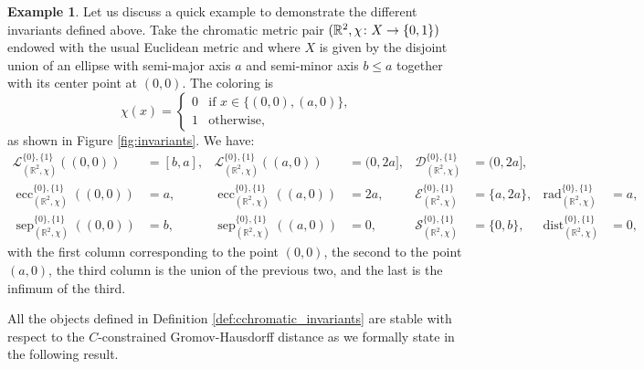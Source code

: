 \documentclass[8pt,a4paper,oneside,english,english]{article}
\theoremstyle{plain}
\theoremstyle
{plain}
\theoremstyle{definition}
\newtheorem{example}[theorem]{Example}%
\DeclareMathOperator{\dist}{dist}
\DeclareMathOperator{\ecc}{ecc}
\DeclareMathOperator{\rad}{rad}
\DeclareMathOperator{\sep}{sep}
\begin{document}
\begin{example} \label{ex:invariants}
    Let us discuss 
    a quick example to demonstrate the different invariants defined above. Take the chromatic metric pair $(\mathbb R^2, \chi\colon X \to \mathbb \{0,1\})$ endowed with the usual Euclidean metric and where $X$ is given by the disjoint union of an ellipse with semi-major axis $a$ and semi-minor axis $b\leq a$ together with its center point at $(0,0)$. The coloring is
    \[ \chi(x) = \begin{cases}
        0 & \text{if }x\in\{(0,0), (a,0)\}, \\
        1 & \text{otherwise},
    \end{cases} 
    \]
    as shown 
    in Figure \ref{fig:invariants}.  
    We have: 
    \begin{align*}
        \mathcal L_{(\mathbb R^2, \chi)}^{\{0\},\{1\}}((0,0)) &= [b,a], &
        \mathcal L_{(\mathbb R^2, \chi)}^{\{0\},\{1\}}((a,0)) &= (0,2a], &
        \mathcal D_{(\mathbb R^2, \chi)}^{\{0\},\{1\}} &= (0,2a], &
        &
        \\
        \ecc_{(\mathbb R^2, \chi)}^{\{0\},\{1\}}((0,0)) &= a, &
        \ecc_{(\mathbb R^2, \chi)}^{\{0\},\{1\}}((a,0)) &= 2a, &
        \mathcal E_{(\mathbb R^2, \chi)}^{\{0\},\{1\}} &= \{a,2a\}, &
        \rad_{(\mathbb R^2, \chi)}^{\{0\},\{1\}} &= a,
        \\
        \sep_{(\mathbb R^2, \chi)}^{\{0\},\{1\}}((0,0)) &= b, &
        \sep_{(\mathbb R^2, \chi)}^{\{0\},\{1\}}((a,0)) &= 0, &
        \mathcal S_{(\mathbb R^2, \chi)}^{\{0\},\{1\}} &= \{0,b\}, &
        \dist_{(\mathbb R^2, \chi)}^{\{0\},\{1\}} &= 0,
    \end{align*}
    with the first column corresponding to the point $(0, 0)$, the second to the point $(a, 0)$, the third column is the union of the previous two, and the last is the infimum of the third.
\end{example}

All the objects defined in Definition \ref{def:cchromatic_invariants} are stable with respect to the $C$-constrained Gromov-Hausdorff distance as we formally state in the following result.
\end{document}
